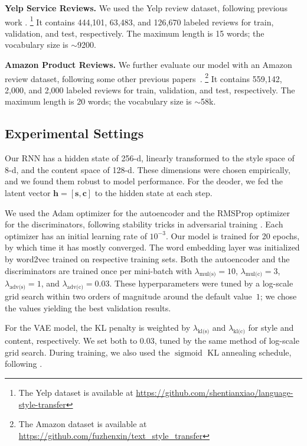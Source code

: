 \documentclass[11pt,a4paper]{article}
\newcommand{\hyp}[1]{\lambda_{\text{#1}}}
\begin{document}
\textbf{Yelp Service Reviews.}
We used the Yelp review dataset, following previous work \cite{shen2017style,zhao2018adversarially}.
\footnote{The Yelp dataset is available at \url{https://github.com/shentianxiao/language-style-transfer}}
It contains 444,101, 63,483, and 126,670 labeled reviews for train, validation, and test, respectively.
The maximum length is 15 words; the vocabulary size is $\sim$9200.

\textbf{Amazon Product Reviews.}
We further evaluate our model with an Amazon review dataset, following some other previous papers~\cite{fu2018style}.
\footnote{The Amazon dataset is available at \url{https://github.com/fuzhenxin/text_style_transfer}}
It contains 559,142, 2,000, and 2,000 labeled reviews for train, validation, and test, respectively.
The maximum length is 20 words; the vocabulary size is $\sim$58k.


\subsection{Experimental Settings}

Our RNN has a hidden state of 256-d, linearly transformed to the style space of 8-d, and the content space of 128-d. These dimensions were chosen empirically, and we found them robust to model performance.
For the deoder, we fed the latent vector $\bm h=[\bm s, \bm c]$ to the hidden state at each step.

We used the Adam optimizer \cite{kingma2014adam} for the autoencoder and the RMSProp optimizer \cite{tieleman2012lecture} for the discriminators, following stability tricks in adversarial training  \cite{arjovsky2017wasserstein}.
Each optimizer has an initial learning rate of $10^{-3}$.
Our model is trained for 20 epochs, by which time it has mostly converged.
The word embedding layer was initialized by word2vec \cite{mikolov2013distributed} trained on respective training sets.
Both the autoencoder and the discriminators are trained once per mini-batch with $\hyp{mul(s)}\!\!=\!\!10$, $\hyp{mul(c)}\!\!=\!\!3$, $\hyp{adv(s)}\!\!=\!\!1$, and $\hyp{adv(c)} = 0.03$.
These hyperparameters were tuned by a log-scale grid search within two orders of magnitude around the default value~$1$; we chose the values yielding the best validation results.

For the VAE model, the KL penalty is weighted by $\hyp{kl(s)}$ and $\hyp{kl(c)}$ for style and content, respectively.
We set both to $0.03$, tuned by the same method of log-scale grid search. During training, we also used the $\operatorname{sigmoid}$ KL annealing schedule, following \citet{bahuleyan2017variational}.
\end{document}
